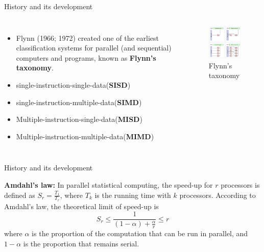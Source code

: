 \documentclass[10pt,aspectratio=169]{beamer}
\begin{document}
\begin{sloppypar}
\begin{frame}{History and its development}
		\begin{columns}      %
				\begin{itemize}
					\item Flynn (1966; 1972) created one of the earliest classification systems for parallel (and sequential) computers and programs, known as {\bf{Flynn's taxonomy}}.
					\item single-instruction-single-data({\bf{SISD}})
					\item single-instruction-multiple-data({\bf{SIMD}})
					\item Multiple-instruction-single-data({\bf{MISD}})
					\item Multiple-instruction-multiple-data({\bf{MIMD}})
				\end{itemize}
	
				\begin{figure}
					\centering
					\includegraphics[width=5cm]{picture//4} 
					\caption{Flynn's taxonomy}
				\end{figure}
			
	\end{columns}
\end{frame}


\begin{frame}{History and its development} \par
{\bf{Amdahl's law:}}
In parallel statistical computing, the speed-up for $r$ processors is defined as $S_r=\frac{T_1}{T_r}$, where $T_k$ is the running time with $k$ processors. According to Amdahl’s law, the theoretical limit of speed-up is
\begin{equation}
S_r \leq \frac{1}{(1-\alpha)+\frac{\alpha}{r}}\leq r   \nonumber
\end{equation} 
where $\alpha$ is the proportion of the computation that can be run in parallel, and $1-\alpha$ is the proportion that remains serial.
\end{frame}



\end{sloppypar}
\end{document}
